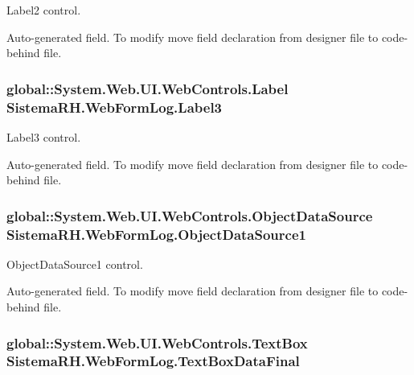 Label2 control. 

Auto-\/generated field. To modify move field declaration from designer file to code-\/behind file. \hypertarget{class_sistema_r_h_1_1_web_form_log_a8c408c2975991423128b56334b0a5320}{
\subsubsection[{Label3}]{\setlength{\rightskip}{0pt plus 5cm}global::System.Web.UI.WebControls.Label {\bf SistemaRH.WebFormLog.Label3}}}
\label{class_sistema_r_h_1_1_web_form_log_a8c408c2975991423128b56334b0a5320}


Label3 control. 

Auto-\/generated field. To modify move field declaration from designer file to code-\/behind file. \hypertarget{class_sistema_r_h_1_1_web_form_log_a91bd5e65c14588e4cb150967d17c38e0}{
\subsubsection[{ObjectDataSource1}]{\setlength{\rightskip}{0pt plus 5cm}global::System.Web.UI.WebControls.ObjectDataSource {\bf SistemaRH.WebFormLog.ObjectDataSource1}}}
\label{class_sistema_r_h_1_1_web_form_log_a91bd5e65c14588e4cb150967d17c38e0}


ObjectDataSource1 control. 

Auto-\/generated field. To modify move field declaration from designer file to code-\/behind file. \hypertarget{class_sistema_r_h_1_1_web_form_log_af57139f8a14c6b29e741f291c4f30641}{
\subsubsection[{TextBoxDataFinal}]{\setlength{\rightskip}{0pt plus 5cm}global::System.Web.UI.WebControls.TextBox {\bf SistemaRH.WebFormLog.TextBoxDataFinal}}}
\label{class_sistema_r_h_1_1_web_form_log_af57139f8a14c6b29e741f291c4f30641}


